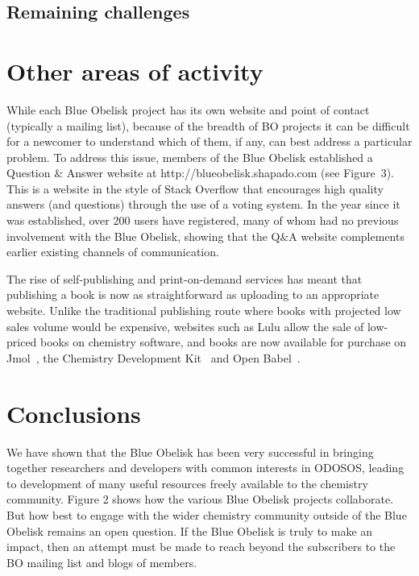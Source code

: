 \documentclass[10pt]{bmc_article}
\newenvironment{bmcformat}{\begin{raggedright}\baselineskip20pt\sloppy\setboolean{publ}{false}}{\end{raggedright}\baselineskip20pt\sloppy}
\begin{document}
\begin{bmcformat}
  \subsection*{Remaining challenges}

\section*{Other areas of activity}

While each Blue Obelisk project has its own website and point of
contact (typically a mailing list), because of the breadth of BO
projects it can be difficult for a newcomer to understand which of
them, if any, can best address a particular problem. To address this
issue, members of the Blue Obelisk established a Question \& Answer
website at http://blueobelisk.shapado.com (see Figure~3). 
This is a website in the
style of Stack Overflow that encourages high quality answers (and
questions) through the use of a voting system. In the year since it
was established, over
200 users have registered, many of whom had no previous involvement
with the Blue Obelisk, showing that the Q\&A website complements
earlier existing channels of communication.

The rise of self-publishing and print-on-demand services has meant
that publishing a book is now as straightforward as uploading to an
appropriate website. Unlike the traditional publishing route where
books with projected low sales volume would be expensive,
websites such as Lulu allow the sale of low-priced books on
chemistry software, and books are now available for purchase
on Jmol~\cite{JmolBook}, the Chemistry Development Kit~\cite{CDKBook}
and Open Babel~\cite{OpenBabelBook}.

\section*{Conclusions}

We have shown that the Blue Obelisk has been very successful
in bringing together researchers and developers with common interests
in ODOSOS, leading to development of many useful resources freely
available to the chemistry community. Figure 2 shows how the various
Blue Obelisk projects collaborate. But how best to engage with the
wider chemistry community outside of the Blue Obelisk remains an open
question. If the Blue Obelisk is truly to make an impact,
then an attempt must be made to reach beyond the subscribers to the
BO mailing list and blogs of members.


\end{bmcformat}
\end{document}
